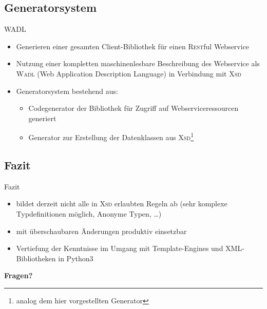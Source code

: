 \subsection{Generatorsystem}
\begin{frame}
    \begin{block}{WADL}
        \begin{itemize}
            \item Generieren einer gesamten Client-Bibliothek für einen \textsc{Rest}ful Webservice
            \item Nutzung einer kompletten maschinenlesbare Beschreibung des Webservice als \textsc{Wadl} (Web Application Description Language) in Verbindung mit \textsc{Xsd}
            \item Generatorsystem bestehend aus:
            \begin{itemize}
                \item Codegenerator der Bibliothek für Zugriff auf Webserviceressourcen generiert
                \item Generator zur Erstellung der Datenklassen aus \textsc{Xsd}\footnote{analog dem hier vorgestellten Generator}
            \end{itemize}
        \end{itemize}
    \end{block}
\end{frame}

\subsection{Fazit}
\begin{frame}{Fazit}
    \begin{itemize}
        \item bildet derzeit nicht alle in \textsc{Xsd} erlaubten Regeln ab (sehr komplexe Typdefinitionen möglich, Anonyme Typen, \ldots)
        \item mit überschaubaren Änderungen produktiv einsetzbar
        \item Vertiefung der Kenntnisse im Umgang mit Template-Engines und XML-Bibliotheken in Python3
    \end{itemize}
\end{frame}

\begin{frame}
    \vspace*{\fill}
        \begin{center}
            \Huge \textbf{Fragen?}
        \end{center}
    \vspace*{\fill}
\end{frame}
